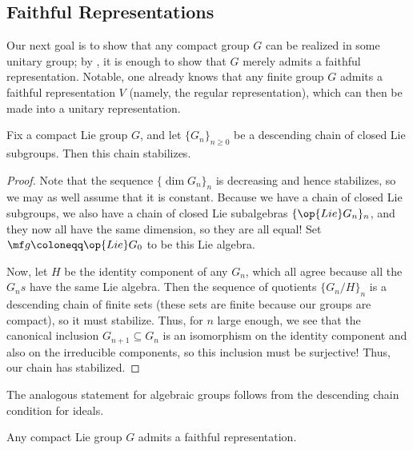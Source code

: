 \documentclass[../notes.tex]{subfiles}
\begin{document}
\subsection{Faithful Representations}
Our next goal is to show that any compact group $G$ can be realized in some unitary group; by , it is enough to show that $G$ merely admits a faithful representation. Notable, one already knows that any finite group $G$ admits a faithful representation $V$ (namely, the regular representation), which can then be made into a unitary representation.
\begin{lemma} \label{lem:subgroup-chain-stabilize}
	Fix a compact Lie group $G$, and let $\{G_n\}_{n\ge0}$ be a descending chain of closed Lie subgroups. Then this chain stabilizes.
\end{lemma}
\begin{proof}
	Note that the sequence $\{\dim G_n\}_n$ is decreasing and hence stabilizes, so we may as well assume that it is constant. Because we have a chain of closed Lie subgroups, we also have a chain of closed Lie subalgebras $\{\op{Lie}G_n\}_n$, and they now all have the same dimension, so they are all equal! Set $\mf g\coloneqq\op{Lie}G_0$ to be this Lie algebra.

	Now, let $H$ be the identity component of any $G_n$, which all agree because all the $G_ns$ have the same Lie algebra. Then the sequence of quotients $\{G_n/H\}_n$ is a descending chain of finite sets (these sets are finite because our groups are compact), so it must stabilize. Thus, for $n$ large enough, we see that the canonical inclusion $G_{n+1}\subseteq G_n$ is an isomorphism on the identity component and also on the irreducible components, so this inclusion must be surjective! Thus, our chain has stabilized.
\end{proof}
\begin{remark}
	The analogous statement for algebraic groups follows from the descending chain condition for ideals.
\end{remark}
\begin{proposition} \label{prop:compact-has-faithful-rep}
	Any compact Lie group $G$ admits a faithful representation.
\end{proposition}
\end{document}

